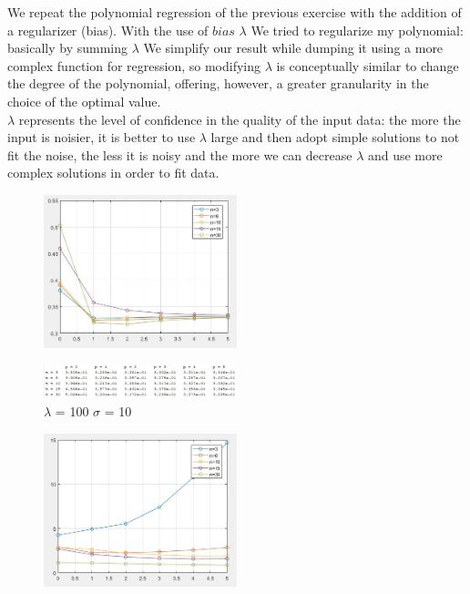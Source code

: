 We repeat the polynomial regression of the previous exercise with the addition of a regularizer (bias). With the use of $bias$ $\lambda$ We tried to regularize my polynomial: basically by summing $\lambda$ We simplify our result while dumping it using a more complex function for regression, so modifying $\lambda$ is conceptually similar to change the degree of the polynomial, offering, however, a greater granularity in the choice of the optimal value.\\
$\lambda$ represents the level of confidence in the quality of the input data: the more the input is noisier, it is better to use $\lambda$ large and then adopt simple solutions to not fit the noise, the less it is noisy and the more we can decrease $\lambda$ and use more complex solutions in order to fit data.\\

\begin{figure}[h]
	\centering
	\includegraphics[width=0.5\textwidth]{pl100s10.png}
\end{figure}

\begin{figure}[h]
	\centering
	\includegraphics[width=0.5\textwidth]{tl100s10.png}
	\caption{$\lambda$ = 100 $\sigma$ = 10}
	\label{fig:lambda = 100 sigma = 10}
\end{figure}

\begin{figure}[h]
	\centering
	\includegraphics[width=0.5\textwidth]{pl0001s10.png}
\end{figure}


